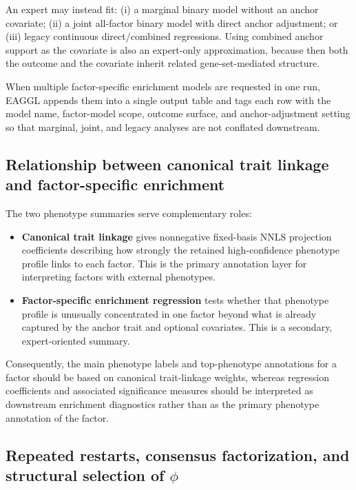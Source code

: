 \documentclass[11pt]{article}
\begin{document}
An expert may instead fit: (i) a marginal binary model without an anchor covariate; (ii) a joint all-factor binary model with direct anchor adjustment; or (iii) legacy continuous direct/combined regressions. Using combined anchor support as the covariate is also an expert-only approximation, because then both the outcome and the covariate inherit related gene-set-mediated structure.

When multiple factor-specific enrichment models are requested in one run, EAGGL appends them into a single output table and tags each row with the model name, factor-model scope, outcome surface, and anchor-adjustment setting so that marginal, joint, and legacy analyses are not conflated downstream.

\subsection{Relationship between canonical trait linkage and factor-specific enrichment}

The two phenotype summaries serve complementary roles:
\begin{itemize}
\item \textbf{Canonical trait linkage} gives nonnegative fixed-basis NNLS projection coefficients describing how strongly the retained high-confidence phenotype profile links to each factor. This is the primary annotation layer for interpreting factors with external phenotypes.
\item \textbf{Factor-specific enrichment regression} tests whether that phenotype profile is unusually concentrated in one factor beyond what is already captured by the anchor trait and optional covariates. This is a secondary, expert-oriented summary.
\end{itemize}

Consequently, the main phenotype labels and top-phenotype annotations for a factor should be based on canonical trait-linkage weights, whereas regression coefficients and associated significance measures should be interpreted as downstream enrichment diagnostics rather than as the primary phenotype annotation of the factor.



\subsection{Repeated restarts, consensus factorization, and structural selection of $\phi$}
\end{document}
